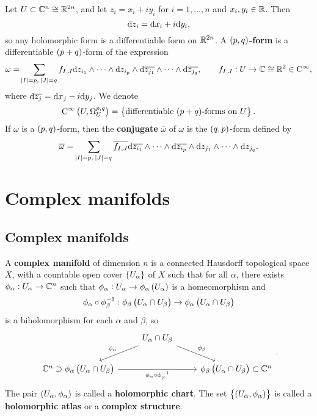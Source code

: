 Let $ U \subset \mathbb{C}^n \cong \mathbb{R}^{2n} $, and let $ z_i = x_i + iy_i $ for $ i = 1, \dots, n $ and $ x_i, y_i \in \mathbb{R} $. Then
$$ \mathrm{d} z_i = \mathrm{d} x_i + i\mathrm{d} y_i, $$
so any holomorphic form is a differentiable form on $ \mathbb{R}^{2n} $. A \textbf{$ \br{p, q} $-form} is a differentiable $ \br{p + q} $-form of the expression
$$ \omega = \sum_{\abs{I} = p, \ \abs{J} = q} f_{I, J}\mathrm{d} z_{i_1} \wedge \dots \wedge \mathrm{d} z_{i_p} \wedge \mathrm{d}\overline{z_{j_1}} \wedge \dots \wedge \mathrm{d}\overline{z_{j_q}}, \qquad f_{I, J} : U \to \mathbb{C} \cong \mathbb{R}^2 \in \mathrm{C}^\infty, $$
where $ \mathrm{d}\overline{z_j} = \mathrm{d} x_j - i\mathrm{d} y_j $. We denote
$$ \C^\infty\br{U, \Omega_U^{p, q}} = \cbr{\text{differentiable $ \br{p + q} $-forms on} \ U}. $$
If $ \omega $ is a $ \br{p, q} $-form, then the \textbf{conjugate} $ \overline{\omega} $ of $ \omega $ is the $ \br{q, p} $-form defined by
$$ \overline{\omega} = \sum_{\abs{I} = p, \ \abs{J} = q} \overline{f_{I, J}}\d\overline{z_{i_1}} \wedge \dots \wedge \d\overline{z_{i_p}} \wedge \d z_{j_1} \wedge \dots \wedge \d z_{j_q}. $$

\pagebreak

\section{Complex manifolds}

\subsection{Complex manifolds}

\begin{definition}
A \textbf{complex manifold} of dimension $ n $ is a connected Hausdorff topological space $ X $, with a countable open cover $ \cbr{U_\alpha} $ of $ X $ such that for all $ \alpha $, there exists $ \phi_\alpha : U_\alpha \to \mathbb{C}^n $ such that $ \phi_\alpha : U_\alpha \to \phi_\alpha\br{U_\alpha} $ is a homeomorphism and
$$ \phi_\alpha \circ \phi_\beta^{-1} : \phi_\beta\br{U_\alpha \cap U_\beta} \to \phi_\alpha\br{U_\alpha \cap U_\beta} $$
is a biholomorphism for each $ \alpha $ and $ \beta $, so
$$
\begin{tikzcd}
& U_\alpha \cap U_\beta \arrow[swap]{dl}{\phi_\alpha} \arrow{dr}{\phi_\beta} & \\
\CC^n \supset \phi_\alpha\br{U_\alpha \cap U_\beta} \arrow[swap]{rr}{\phi_\alpha \circ \phi_\beta^{-1}} & & \phi_\beta\br{U_\alpha \cap U_\beta} \subset \CC^n
\end{tikzcd}.
$$
The pair $ \br{U_\alpha, \phi_\alpha} $ is called a \textbf{holomorphic chart}. The set $ \cbr{\br{U_\alpha, \phi_\alpha}} $ is called a \textbf{holomorphic atlas} or a \textbf{complex structure}.
\end{definition}

